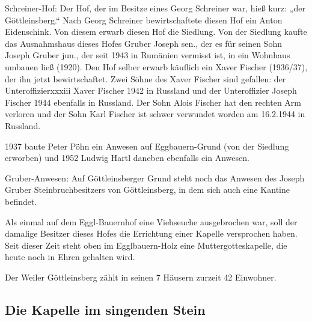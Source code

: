 \documentclass[12pt,a4pager]{book}
\begin{document}
Schreiner-Hof: Der Hof, der im Besitze eines Georg Schreiner war, hieß kurz:
„der Göttleinsberg.“ Nach Georg Schreiner bewirtschaftete diesen Hof ein Anton
Eidenschink. Von diesem erwarb diesen Hof die Siedlung. Von der Siedlung kaufte
das Ausnahmshaus dieses Hofes Gruber Joseph sen., der es für seinen Sohn Joseph
Gruber jun., der seit 1943 in Rumänien vermisst ist, in ein Wohnhaus umbauen
ließ (1920). Den Hof selber erwarb käuflich ein Xaver Fischer (1936/37), der ihn
jetzt bewirtschaftet. Zwei Söhne des Xaver Fischer sind gefallen: der
Unteroffizierxxxiii Xaver Fischer 1942 in Russland und der Unteroffizier Joseph
Fischer 1944 ebenfalls in Russland. Der Sohn Alois Fischer hat den rechten Arm
verloren und der Sohn Karl Fischer ist schwer verwundet worden am 16.2.1944 in
Russland.

1937 baute Peter Pöhn ein Anwesen auf Eggbauern-Grund (von der Siedlung
erworben) und 1952 Ludwig Hartl daneben ebenfalls ein Anwesen.

Gruber-Anwesen: Auf Göttleinsberger Grund steht noch das Anwesen des Joseph
Gruber Steinbruchbesitzers von Göttleinsberg, in dem sich auch eine Kantine
befindet.

Als einmal auf dem Eggl-Bauernhof eine Viehseuche ausgebrochen war, soll der
damalige Besitzer dieses Hofes die Errichtung einer Kapelle versprochen haben.
Seit dieser Zeit steht oben im Egglbauern-Holz eine Muttergotteskapelle, die
heute noch in Ehren gehalten wird.

Der Weiler Göttleinsberg zählt in seinen 7 Häusern zurzeit 42 Einwohner.

\subsection{Die Kapelle im singenden Stein}
\end{document}
